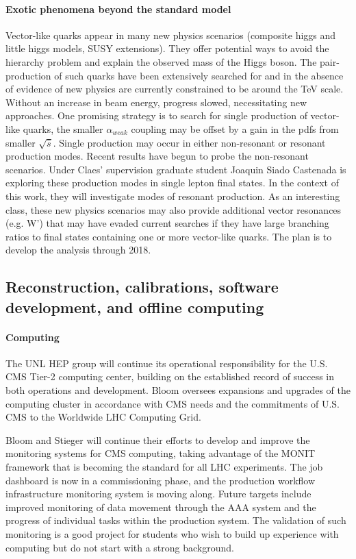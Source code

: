 \paragraph{Exotic phenomena beyond the standard model}
 Vector-like quarks appear in many new physics scenarios (composite higgs and little higgs models, SUSY extensions). They offer potential ways to avoid the hierarchy problem and explain the observed mass of the Higgs boson.  The pair-production of such quarks have been extensively searched for and in the absence of evidence of new physics are currently constrained to be around the TeV scale.  Without an increase in beam energy, progress slowed, necessitating new approaches. One promising strategy is to search for single production of vector-like quarks, the smaller $\alpha_{weak}$ coupling may be offset by a gain in the pdfs from smaller $\sqrt{\hat{s}}$. Single production may occur in either non-resonant or resonant production modes.  Recent results have begun to probe the non-resonant scenarios. Under Claes’ supervision graduate student Joaquin Siado Castenada is exploring these production modes in single lepton final states. In the context of this work, they will investigate modes of resonant production. As an interesting class, these new physics scenarios may also provide additional vector resonances (e.g. W’) that may have evaded current searches if they have large branching ratios to final states containing one or more vector-like quarks. The plan is to develop the analysis through 2018.

\subsection{Reconstruction, calibrations, software development, and offline computing}

\paragraph{Computing} The UNL HEP group will continue its operational responsibility for the U.S. CMS Tier-2 computing center, building on the established record of success in both operations and development. Bloom oversees expansions and upgrades of the computing cluster in accordance with CMS needs and the commitments of U.S. CMS to the Worldwide LHC Computing Grid.

Bloom and Stieger will continue their efforts to develop and improve the monitoring systems for CMS computing, taking advantage of the MONIT framework that is becoming the standard for all LHC experiments.  The job dashboard is now in a commissioning phase, and the production workflow infrastructure monitoring system is moving along.  Future targets include improved monitoring of data movement through the AAA system and the progress of individual tasks within the production system.  The validation of such monitoring is a good project for students who wish to build up experience with computing but do not start with a strong background.

